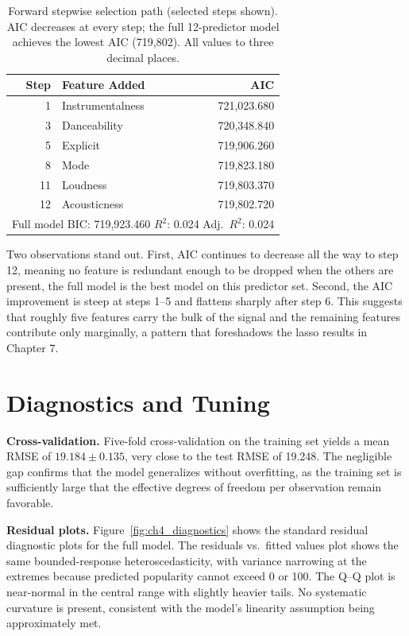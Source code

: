 \documentclass[12pt, oneside]{book}
\begin{document}
\begin{table}[H]
\centering
\caption{Forward stepwise selection path (selected steps shown). AIC decreases at every step; the full 12-predictor model achieves the lowest AIC (719{,}802). All values to three decimal places.}
\label{tab:ch4_subset}
\small
\begin{tabular}{rlr}
\toprule
\textbf{Step} & \textbf{Feature Added} & \textbf{AIC} \\
\midrule
1  & Instrumentalness & 721{,}023.680 \\
3  & Danceability     & 720{,}348.840 \\
5  & Explicit         & 719{,}906.260 \\
8  & Mode             & 719{,}823.180 \\
11 & Loudness         & 719{,}803.370 \\
12 & Acousticness     & 719{,}802.720 \\
\midrule
\multicolumn{3}{l}{Full model BIC: 719{,}923.460 \quad $R^2$: 0.024 \quad Adj.\ $R^2$: 0.024} \\
\bottomrule
\end{tabular}
\end{table}
 
Two observations stand out. First, AIC continues to decrease all the way to step 12, meaning no feature is redundant enough to be dropped when the others are present, the full model is the best model on this predictor set. Second, the AIC improvement is steep at steps 1--5 and flattens sharply after step 6. This suggests that roughly five features carry the bulk of the signal and the remaining features contribute only marginally, a pattern that foreshadows the lasso results in Chapter 7.
 
\section{Diagnostics and Tuning}
 
\textbf{Cross-validation.} Five-fold cross-validation on the training set yields a mean RMSE of $19.184 \pm 0.135$, very close to the test RMSE of 19.248. The negligible gap confirms that the model generalizes without overfitting, as the training set is sufficiently large that the effective degrees of freedom per observation remain favorable.
 
\textbf{Residual plots.} Figure~\ref{fig:ch4_diagnostics} shows the standard residual diagnostic plots for the full model. The residuals vs.\ fitted values plot shows the same bounded-response heteroscedasticity, with variance narrowing at the extremes because predicted popularity cannot exceed 0 or 100. The Q--Q plot is near-normal in the central range with slightly heavier tails. No systematic curvature is present, consistent with the model's linearity assumption being approximately met.
 
\end{document}
